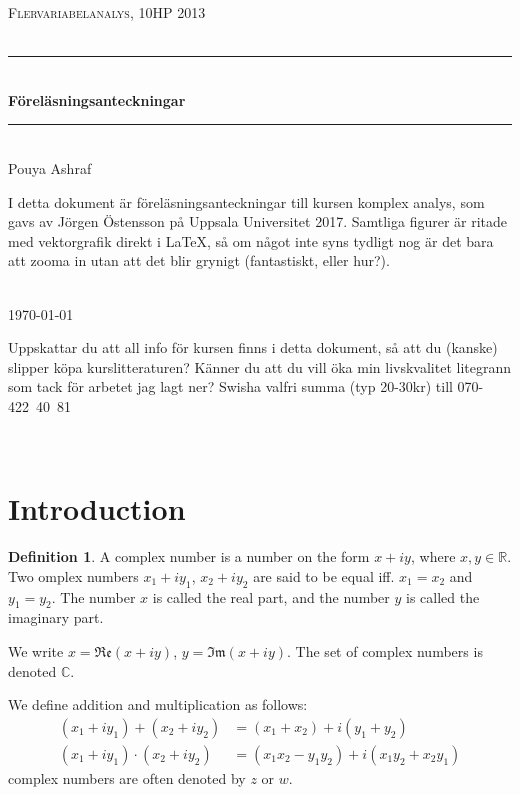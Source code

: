 \documentclass[12pt, a4paper]{article}
\theoremstyle{plain}
\theoremstyle{definition}
\newtheorem{definition}{Definition} %
\newcommand{\HRule}{\rule{\linewidth}{0.5mm}} %
\begin{document}
	\thispagestyle{empty}
	\begin{center}
		\textsc{\Large Flervariabelanalys, 10HP 2013}\\[0.5cm] %
		\textsc{\large }\\[0.5cm] %
		
		\HRule \\[0.4cm]
		{ \huge \bfseries Föreläsningsanteckningar}\\[0.2cm] %
		
		\HRule \\[1.5cm]
		\large Pouya Ashraf\\[3cm]%
		
		\parbox{12cm}{I detta dokument är föreläsningsanteckningar till kursen komplex analys, som gavs av Jörgen Östensson på Uppsala Universitet 2017. Samtliga figurer är ritade med vektorgrafik direkt i \LaTeX, så om något inte syns tydligt nog är det bara att zooma in utan att det blir grynigt (fantastiskt, eller hur?).}\\[3cm]


		{\large \today} %

		\newpage
		\vspace*{\fill}
			\parbox{12cm}{Uppskattar du att all info för kursen finns i detta dokument, så att du (kanske) slipper köpa kurslitteraturen? Känner du att du vill öka min livskvalitet litegrann som tack för arbetet jag lagt ner? Swisha valfri summa (typ 20-30kr) till \mbox{070-422 40 81}}\\
		\vspace*{\fill}
	\end{center}
	\newpage

	\tableofcontents
	\newpage
	
	\section{Introduction} %
	\label{sec:introduction}
		\begin{definition}
			A complex number is a number on the form $x+iy$, where $x,y\in\mathbb{R}$. Two omplex numbers $x_1+iy_1$, $x_2+iy_2$ are said to be equal iff. $x_1=x_2$ and $y_1=y_2$. The number $x$ is called the real part, and the number $y$ is called the imaginary part.

			We write $x=\mathfrak{Re}(x+iy)$, $y=\mathfrak{Im}(x+iy)$. The set of complex numbers is denoted $\mathbb{C}$.

			We define addition and multiplication as follows:
			\begin{align*}
				(x_1+iy_1)+(x_2+iy_2) &= (x_1+x_2) + i(y_1+y_2)\\
				(x_1+iy_1)\cdot(x_2+iy_2) &= (x_1x_2-y_1y_2)+i(x_1y_2+x_2y_1)
			\end{align*}
			complex numbers are often denoted by $z$ or $w$.\\
		\end{definition}
\end{document}
